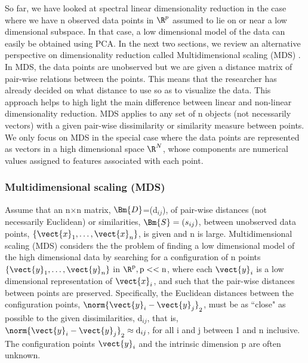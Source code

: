 So far, we have looked at spectral linear dimensionality reduction in the case where we have n observed data points in $\R^{p}$ assumed to lie on or near a low dimensional subspace. In that case, a low dimensional model of the data can easily be obtained using PCA. In the next two sections, we review an alternative perspective on dimensionality reduction called Multidimensional scaling (MDS) 
\cite{CoxT2000, MardiaK.V1979Ma}. In MDS, the data points are unobserved but we are given a distance matrix of pair-wise relations between the points.
This means that the researcher has already decided on what distance to use so as
to visualize the data. This approach helps to high light the main difference between linear and non-linear dimensionality reduction. MDS applies to any set of n objects (not necessarily vectors) with a given pair-wise dissimilarity
or similarity measure between points. We only focus on MDS in the special case where the data points are represented as vectors in a high dimensional space $\R^{N}$, whose components are numerical values assigned to features associated with each point.


%



\subsubsection{Multidimensional scaling (MDS)}
Assume that an n$\times$n matrix, $\Bm{D}$=(d$_{ij}$), of pair-wise distances
(not necessarily Euclidean) or similarities, $\Bm{S} = (s_{ij})$, between unobserved  data points, $\{\vect{x}_{1}, \ldots, \vect{x}_{n} \}$, is given and n is large.
Multidimensional scaling (MDS) \cite{CoxT2000, MardiaK.V1979Ma} considers the the problem of finding a low dimensional model of the high dimensional data by searching for a configuration of n points $\{\vect{y}_{1}, \ldots, \vect{y}_{n} \}$ in $\R^{\text{p}}, \text{p} << \text{n}$, where each $\vect{y}_{i}$ is a low dimensional representation of $\vect{x}_{i}$, and such that the pair-wise distances between points are preserved. Specifically, the Euclidean distances between the configuration points, $\norm{\vect{y}_{i} - \vect{y}_{j}}_{2}$, must be as ``close" as possible to  the given dissimilarities, d$_{ij}$, that is, $\norm{\vect{y}_{i} - \vect{y}_{j}}_{2} \approx \text{d}_{ij}$, for all i and j between 1 and n inclusive. The configuration points $\vect{y}_{i}$ and the intrinsic dimension 
p are often unknown.\\

